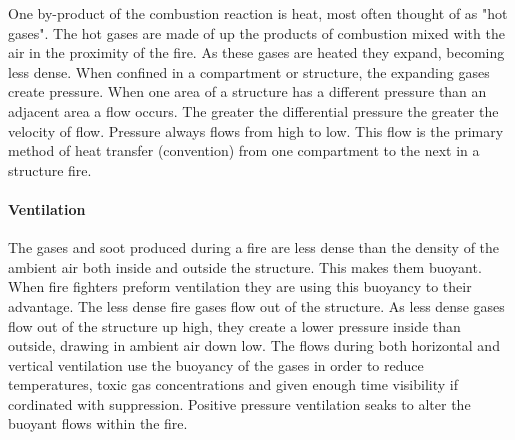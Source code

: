\documentclass{article}
\begin{document}
One by-product of the combustion reaction is heat, most often thought of as "hot gases". The hot gases are made of up the products of combustion mixed with the air in the proximity of the fire. As these gases are heated they expand, becoming less dense. When confined in a compartment or structure, the expanding gases create pressure. When one area of a structure has a different pressure than an adjacent area a flow occurs. The greater the differential pressure the greater the velocity of flow. Pressure always flows from high to low. This flow is the primary method of heat transfer (convention) from one compartment to the next in a structure fire. 

\paragraph{Ventilation} \mbox{}

The gases and soot produced during a fire are less dense than the density of the ambient air both inside and outside the structure. This makes them buoyant. When fire fighters preform ventilation they are using this buoyancy to their advantage. The less dense fire gases flow out of the structure. As less dense gases flow out of the structure up high, they create a lower pressure inside than outside, drawing in ambient air down low. The flows during both horizontal and vertical ventilation use the buoyancy of the gases in order to reduce temperatures, toxic gas concentrations and given enough time visibility if cordinated with suppression. Positive pressure ventilation seaks to alter the buoyant flows within the fire. 
\end{document}
